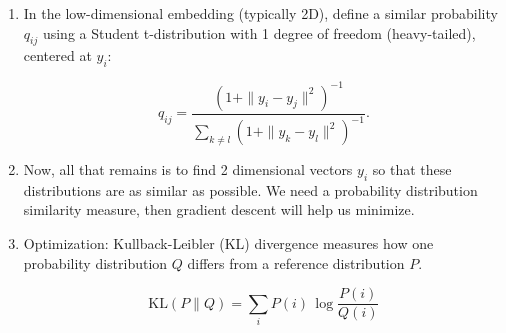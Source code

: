 \documentclass{article}
\begin{document}
\begin{enumerate}
\begin{enumerate}
\begin{itemize}
\item The similarity between points $x_i$ and $x_j$ is modeled as a conditional probability $p_{j|i}$, proportional to a Gaussian centered at $x_i$:

\[
p_{j|i} = \frac{\exp\big(-\|x_i - x_j\|^2 / 2\sigma_i^2\big)}{\sum_{k \neq i} \exp\big(-\|x_i - x_k\|^2 / 2\sigma_i^2\big)},
\]

where $\sigma_i$ is chosen to match a fixed \textbf{perplexity} (a user-specified effective number of likely neighbors). Note that this definition has $p_{i|i}=0$. Also similarities add to 1 via the fraction normalization.

\item Symmetrize probabilities: Note that above conditional probability is not symmetric, so we average over dimension $n$ to make it so.

\[
p_{ij} = \frac{p_{j|i} + p_{i|j}}{2n}.
\]
\end{itemize}

\item In the low-dimensional embedding (typically 2D), define a similar probability $q_{ij}$ using a Student t-distribution with 1 degree of freedom (heavy-tailed), centered at $y_i$:

\[
q_{ij} = \frac{(1 + \|y_i - y_j\|^2)^{-1}}{\sum_{k \neq l} (1 + \|y_k - y_l\|^2)^{-1}}.
\]

\item Now, all that remains is to find 2 dimensional vectors $y_i$ so that these distributions are as similar as possible. We need a probability distribution similarity measure, then gradient descent will help us minimize.

\item Optimization: Kullback-Leibler (KL) divergence measures how one probability distribution $Q$ differs from a reference distribution $P$.  

\[
\text{KL}(P \| Q) = \sum_i P(i) \, \log \frac{P(i)}{Q(i)}
\]


\end{enumerate}
\end{enumerate}
\end{document}

